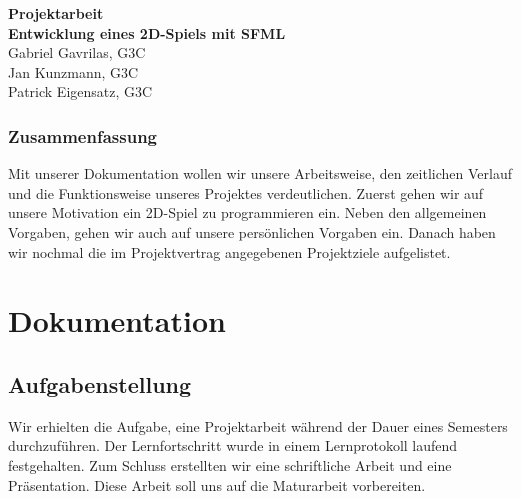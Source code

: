 \documentclass[11pt,a4paper]{scrbook}
\begin{document}
\begin{titlepage}
\begin{center}

\vspace*{3cm}
\textbf{\huge{Projektarbeit}}\\
\vspace*{2cm}
\textbf{\large{Entwicklung eines 2D-Spiels mit SFML}}\\
\vspace*{5cm}
Gabriel Gavrilas, G3C\\
Jan Kunzmann, G3C\\
Patrick Eigensatz, G3C
\end{center}
\end{titlepage}


\clearpage
\thispagestyle{empty}


\section*{Zusammenfassung}
Mit unserer Dokumentation wollen wir unsere Arbeitsweise, den zeitlichen Verlauf und die Funktionsweise unseres Projektes verdeutlichen.
Zuerst gehen wir auf unsere Motivation ein 2D-Spiel zu programmieren ein.
Neben den allgemeinen Vorgaben, gehen wir auch auf unsere persönlichen Vorgaben ein.
Danach haben wir nochmal die im Projektvertrag angegebenen Projektziele aufgelistet.

 



\thispagestyle{empty}
\clearscrheadfoot
\lofoot[\pagemark]{\pagemark}
\thispagestyle{empty}
\tableofcontents

\clearpage
{}


\part{Dokumentation}
\chapter{Aufgabenstellung}
Wir erhielten die Aufgabe, eine Projektarbeit während der Dauer eines Semesters durchzuführen. Der Lernfortschritt wurde in einem Lernprotokoll laufend festgehalten.
Zum Schluss erstellten wir eine schriftliche Arbeit und eine Präsentation. Diese Arbeit soll uns auf die Maturarbeit vorbereiten.
\end{document}
